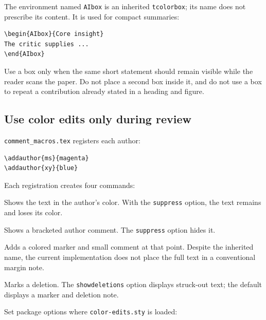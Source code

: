 The environment named \texttt{AIbox} is an inherited
\texttt{tcolorbox}; its name does not prescribe its content. It is used for
compact summaries:

\begin{verbatim}
\begin{AIbox}{Core insight}
The critic supplies ...
\end{AIbox}
\end{verbatim}

Use a box only when the same short statement should remain visible while the
reader scans the paper. Do not place a second box inside it, and do not use a
box to repeat a contribution already stated in a heading and figure.

\subsection{Use color edits only during review}

\texttt{comment\_macros.tex} registers each author:

\begin{verbatim}
\addauthor{ms}{magenta}
\addauthor{xy}{blue}
\end{verbatim}

Each registration creates four commands:

\begin{description}[leftmargin=*,style=nextline]
    \item[\texttt{\textbackslash xyedit\{new text\}}]
    Shows the text in the author's color. With the
    \texttt{suppress} option, the text remains and loses its color.

    \item[\texttt{\textbackslash xycomment\{question\}}]
    Shows a bracketed author comment. The \texttt{suppress} option hides it.

    \item[\texttt{\textbackslash xymargincomment\{question\}}]
    Adds a colored marker and small comment at that point. Despite the inherited
    name, the current implementation does not place the full text in a
    conventional margin note.

    \item[\texttt{\textbackslash xydelete\{old text\}}]
    Marks a deletion. The \texttt{showdeletions} option displays struck-out
    text; the default displays a marker and deletion note.
\end{description}

Set package options where \texttt{color-edits.sty} is loaded:

